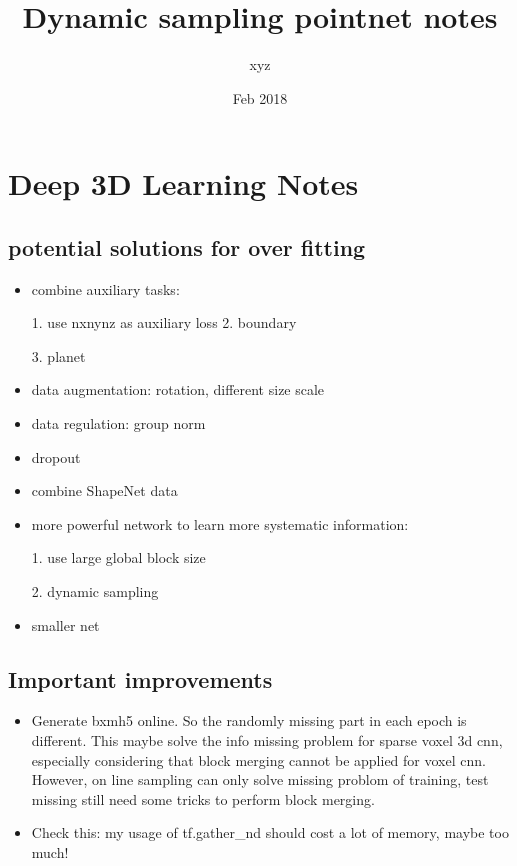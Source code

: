 \documentclass[,table,dvipsnames]{article}
\title{Dynamic sampling pointnet notes}
\author{xyz}
\date{Feb 2018}
\begin{document}
\noindent
\begin{titlepage}
\maketitle
\end{titlepage}	

\tableofcontents{}
\section{Deep 3D Learning Notes}

\subsection{potential solutions for over fitting}
\begin{itemize}
	\item combine auxiliary tasks:\par 
	1. use nxnynz as auxiliary loss
	2. boundary \par 
	3. planet \par 
	\item data augmentation: rotation, different size scale
	\item data regulation: group norm
	\item dropout
	\item combine ShapeNet data
	\item more powerful network to learn more systematic information:\par
	1. use large global block size\par
	2. dynamic sampling
	\item smaller net
\end{itemize}

\subsection{Important improvements}
\begin{itemize}
	\item Generate bxmh5 online. So the randomly missing part in each epoch is different. This maybe solve the info missing problem for sparse voxel 3d cnn, especially considering that block merging cannot be applied for voxel cnn. However, on line sampling can only solve missing problom of training, test missing still need some tricks to perform block merging.
	\item Check this: my usage of tf.gather\_nd should cost a lot of memory, maybe too much!
\end{itemize}
\end{document}
